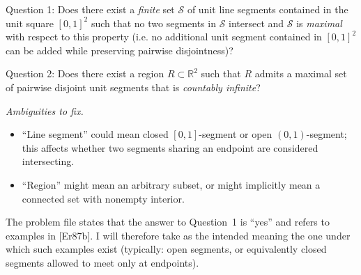 Question 1: Does there exist a \emph{finite} set $\mathcal{S}$ of unit line segments contained in the unit square $[0,1]^2$ such that no two segments in $\mathcal{S}$ intersect and $\mathcal{S}$ is \emph{maximal} with respect to this property (i.e. no additional unit segment contained in $[0,1]^2$ can be added while preserving pairwise disjointness)?

Question 2: Does there exist a region $R\subset\mathbb{R}^2$ such that $R$ admits a maximal set of pairwise disjoint unit segments that is \emph{countably infinite}?

\emph{Ambiguities to fix.}
\begin{itemize}
\item ``Line segment'' could mean closed $[0,1]$-segment or open $(0,1)$-segment; this affects whether two segments sharing an endpoint are considered intersecting.
\item ``Region'' might mean an arbitrary subset, or might implicitly mean a connected set with nonempty interior.
\end{itemize}
The problem file states that the answer to Question~1 is ``yes'' and refers to examples in [Er87b].  I will therefore take as the intended meaning the one under which such examples exist (typically: open segments, or equivalently closed segments allowed to meet only at endpoints).
